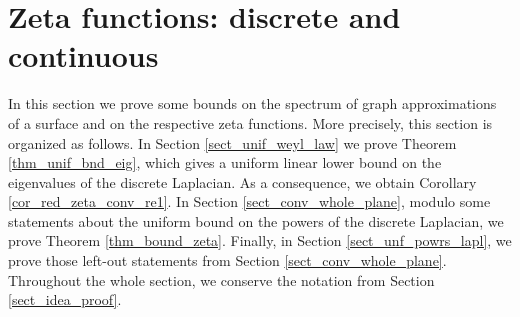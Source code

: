 \documentclass[12pt]{article}
\numberwithin{equation}{section}
\theoremstyle{theorem}
\theoremstyle{definition}
\theoremstyle{remark}
\begin{document}
\section{Zeta functions: discrete and continuous}\label{sect_main_zeta}
In this section we prove some bounds on the spectrum of graph approximations of a surface and on the respective zeta functions.
More precisely, this section is organized as follows. In Section \ref{sect_unif_weyl_law} we prove Theorem \ref{thm_unif_bnd_eig}, which gives a uniform linear lower bound on the eigenvalues of the discrete Laplacian.
As a consequence, we obtain Corollary \ref{cor_red_zeta_conv_re1}.
In Section \ref{sect_conv_whole_plane}, modulo some statements about the uniform bound on the powers of the discrete Laplacian, we prove Theorem \ref{thm_bound_zeta}.
Finally, in Section \ref{sect_unf_powrs_lapl}, we prove those left-out statements from Section \ref{sect_conv_whole_plane}.
Throughout the whole section, we conserve the notation from Section \ref{sect_idea_proof}.
\end{document}
